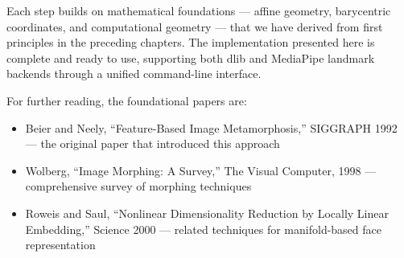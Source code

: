 Each step builds on mathematical foundations — affine geometry, barycentric coordinates, and computational geometry — that we have derived from first principles in the preceding chapters. The implementation presented here is complete and ready to use, supporting both dlib and MediaPipe landmark backends through a unified command-line interface.

For further reading, the foundational papers are:
\begin{itemize}
    \item Beier and Neely, ``Feature-Based Image Metamorphosis,'' SIGGRAPH 1992 --- the original paper that introduced this approach
    \item Wolberg, ``Image Morphing: A Survey,'' The Visual Computer, 1998 --- comprehensive survey of morphing techniques
    \item Roweis and Saul, ``Nonlinear Dimensionality Reduction by Locally Linear Embedding,'' Science 2000 --- related techniques for manifold-based face representation
\end{itemize}
